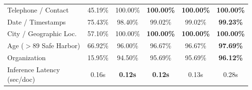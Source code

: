 \begin{table}[t]
\begin{tabular}{l ccccc}
Telephone / Contact & 45.19\% & 100.00\% & \textbf{100.00\%} & \textbf{100.00\%} & \textbf{100.00\%} \\
Date / Timestamps & 75.43\% & 98.40\% & 99.02\% & 99.02\% & \textbf{99.23\%} \\
City / Geographic Loc. & 57.10\% & 100.00\% & \textbf{100.00\%} & \textbf{100.00\%} & \textbf{100.00\%} \\
Age ($>89$ Safe Harbor) & 66.92\% & 96.00\% & 96.67\% & 96.67\% & \textbf{97.69\%} \\
Organization & 15.95\% & 94.50\% & 95.69\% & 95.69\% & \textbf{96.12\%} \\
\midrule
Inference Latency (sec/doc) & 0.16s & \textbf{0.12s} & \textbf{0.12s} & 0.13s & 0.28s \\
\bottomrule
\end{tabular}
\end{table}
